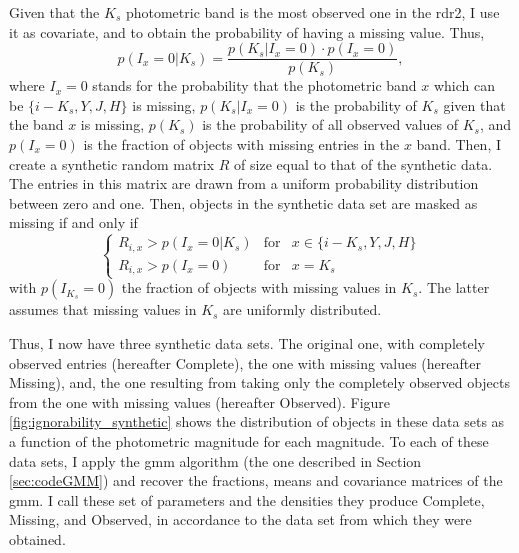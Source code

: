 Given that the $K_s$ photometric band is the most observed one in the \gls{rdr2}, I use it as covariate, and to obtain the probability of having a missing value. Thus,
\begin{equation}
p(I_x=0 | K_s)=\frac{p(K_s|I_x = 0)\cdot p(I_x=0)}{p(K_s)},\nonumber
\end{equation}
where $I_x=0$ stands for the probability that the photometric band $x$ which can be $\{i-K_s,Y,J,H\}$ is missing, $p(K_s|I_x = 0)$ is the probability of $K_s$ given that the band $x$ is missing, $p(K_s)$ is the probability of all observed values of $K_s$, and $p(I_x=0)$ is the fraction of objects with missing entries in the $x$ band. Then, I create a synthetic random matrix $R$ of size equal to that of the synthetic data. The entries in this matrix are drawn from a uniform probability distribution between zero and one. Then, objects in the synthetic data set are masked as missing if and only if 
\begin{equation}
\label{eq:mask_missing}
 \left\{ \begin{array}{rcl}
       R_{i,x} > p(I_x=0 | K_s) & \mbox{for} & x\in \{i-K_s,Y,J,H\} \\ 
       R_{i,x} > p(I_x=0 ) & \mbox{for} & x =K_s 
\end{array}\right.
\end{equation}
with $p(I_{K_s}=0 )$ the fraction of objects with missing values in $K_s$. The latter assumes that missing values in $K_s$ are uniformly distributed.

Thus, I now have three synthetic data sets. The original one, with completely observed entries (hereafter Complete), the one with missing values (hereafter Missing), and, the one resulting from taking only the completely observed objects from the one with missing values (hereafter Observed). Figure \ref{fig:ignorability_synthetic} shows the distribution of objects in these data sets as a function of the photometric magnitude for each magnitude. To each of these data sets, I apply the \gls{gmm} algorithm (the one described in Section \ref{sec:codeGMM}) and recover the fractions, means and covariance matrices of the \gls{gmm}. I call these set of parameters and the densities they produce Complete, Missing, and Observed, in accordance to the data set from which they were obtained.

